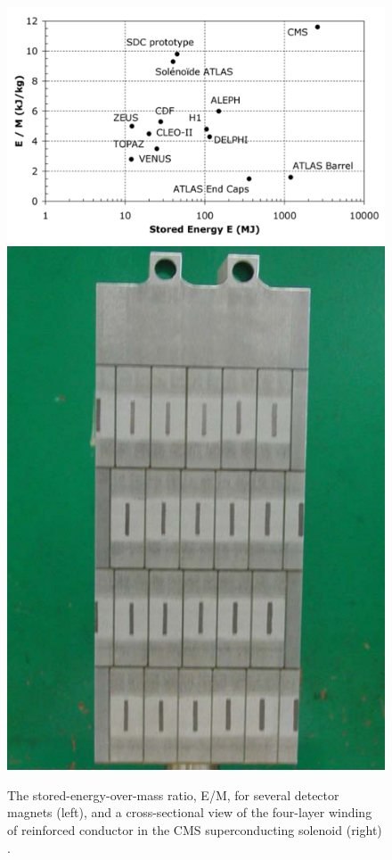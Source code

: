 \begin{figure}[hbtp]
\centering
\includegraphics[scale=0.25]{figures/lhc_and_cms/solenoid_energyOverMass_vs_mass.png}
\hspace{5 mm}
\includegraphics[scale=0.23]{figures/lhc_and_cms/solenoid_cross_section.png}
\caption{The stored-energy-over-mass ratio, E/M, for several detector magnets (left), and a cross-sectional view of the four-layer winding of reinforced conductor in the CMS superconducting solenoid (right) \cite{cms_experiment}.}
\label{solenoid_figures}
\end{figure}